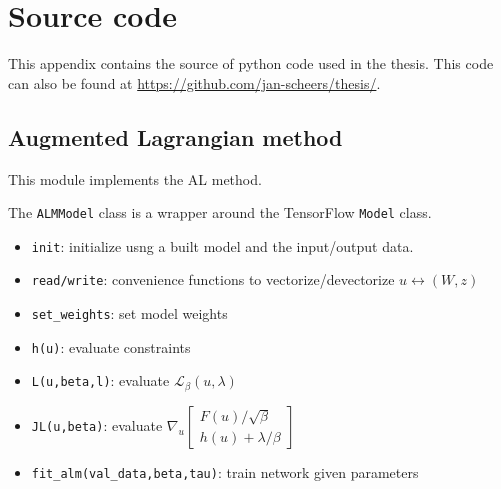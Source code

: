 \chapter{Source code}
\label{app:B}
This appendix contains the source of python code used in the thesis. This code can also be found at \url{https://github.com/jan-scheers/thesis/}.
\footnotesize
\section{Augmented Lagrangian method}
This module implements the AL method. 

The \texttt{ALMModel} class is a wrapper around the TensorFlow \texttt{Model} class. 
\begin{itemize}
\item \texttt{init}:  initialize usng a built model and the input/output data.
\item \texttt{read/write}: convenience functions to vectorize/devectorize $ u \leftrightarrow (W,z)$
\item \texttt{set\_weights}: set model weights
\item \texttt{h(u)}: evaluate constraints
\item \texttt{L(u,beta,l)}: evaluate $\mathcal{L}_{\beta}(u,\lambda)$
\item \texttt{JL(u,beta)}: evaluate $\nabla_u \begin{bmatrix} F(u)/\sqrt{\beta} \\ h(u) + \lambda/\beta \end{bmatrix}$
\item \texttt{fit\_alm(val\_data,beta,tau)}: train network given parameters
\end{itemize}

